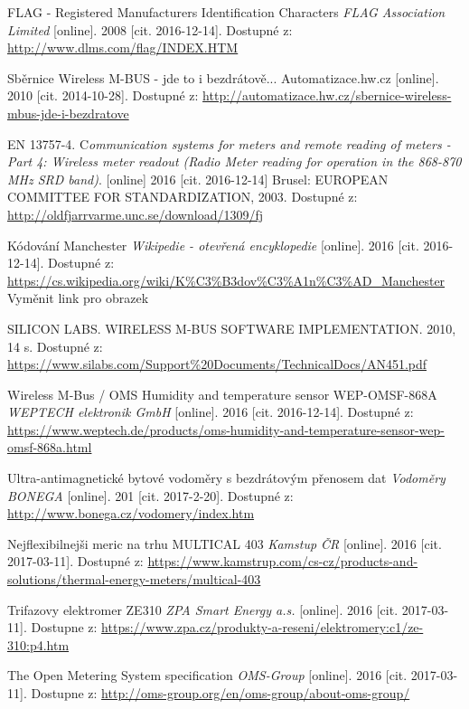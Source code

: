 \begin{literatura}{99}
 	 	FLAG - Registered Manufacturers Identification Characters \textit{FLAG Association Limited} [online]. 2008 [cit. 2016-12-14]. Dostupné z: \url{http://www.dlms.com/flag/INDEX.HTM}

 Sběrnice Wireless M-BUS - jde to i bezdrátově... Automatizace.hw.cz [online]. 2010 [cit. 2014-10-28]. Dostupné z: \url{http://automatizace.hw.cz/sbernice-wireless-mbus-jde-i-bezdratove}

 EN 13757-4. C\textit{ommunication systems for meters and remote reading of meters - Part 4: Wireless meter readout (Radio Meter reading for operation in the 868-870 MHz SRD band)}. [online] 2016 [cit. 2016-12-14] Brusel: EUROPEAN COMMITTEE FOR STANDARDIZATION, 2003. Dostupné z: \url{http://oldfjarrvarme.unc.se/download/1309/fj}

 Kódování Manchester \textit{Wikipedie - otevřená encyklopedie} [online]. 2016 [cit. 2016-12-14]. Dostupné z: \url{https://cs.wikipedia.org/wiki/K\%C3\%B3dov\%C3\%A1n\%C3\%AD\_Manchester} \colorbox[rgb]{1,0,0}{Vyměnit link pro obrazek}

 SILICON LABS. WIRELESS M-BUS SOFTWARE IMPLEMENTATION. 2010, 14 s. Dostupné z: \url{https://www.silabs.com/Support\%20Documents/TechnicalDocs/AN451.pdf}

 Wireless M-Bus / OMS Humidity and temperature sensor WEP-OMSF-868A \textit{WEPTECH elektronik GmbH} [online]. 2016 [cit. 2016-12-14]. Dostupné z: \url{https://www.weptech.de/products/oms-humidity-and-temperature-sensor-wep-omsf-868a.html}

 Ultra-antimagnetické bytové vodoměry s bezdrátovým přenosem dat \textit{Vodoměry BONEGA} [online]. 201 [cit. 2017-2-20]. Dostupné z: \url{http://www.bonega.cz/vodomery/index.htm}

 Nejflexibilnejši meric na trhu MULTICAL 403 \textit{Kamstup ČR} [online]. 2016 [cit. 2017-03-11]. Dostupné z: \url{https://www.kamstrup.com/cs-cz/products-and-solutions/thermal-energy-meters/multical-403}

 Trifazovy elektromer ZE310 \textit{ZPA Smart Energy a.s.} [online]. 2016 [cit. 2017-03-11]. Dostupne z: \url{https://www.zpa.cz/produkty-a-reseni/elektromery:c1/ze-310:p4.htm}

 The Open Metering System specification \textit{OMS-Group} [online]. 2016 [cit. 2017-03-11]. Dostupne z: \url{http://oms-group.org/en/oms-group/about-oms-group/}


\end{literatura}
